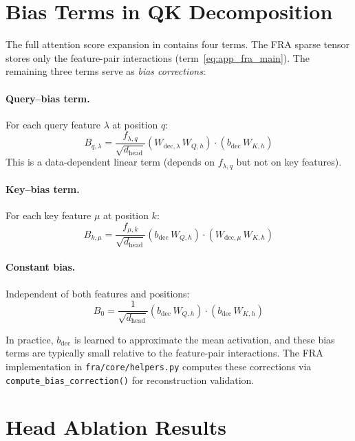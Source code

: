 \documentclass{article}
\theoremstyle{plain}
\theoremstyle{definition}
\theoremstyle{remark}
\newcommand{\dhead}{d_{\mathrm{head}}}
\begin{document}
\section{Bias Terms in QK Decomposition}
\label{app:bias_terms}

The full attention score expansion in  contains four terms. The FRA sparse tensor stores only the feature-pair interactions (term~\ref{eq:app_fra_main}). The remaining three terms serve as \emph{bias corrections}:

\paragraph{Query--bias term.} For each query feature $\lambda$ at position $q$:
\begin{equation}
    B_{q,\lambda} = \frac{f_{\lambda,q}}{\sqrt{\dhead}} \left( W_{\mathrm{dec},\lambda}\,W_{Q,h} \right) \cdot \left( b_{\mathrm{dec}}\,W_{K,h} \right)
\end{equation}
This is a data-dependent linear term (depends on $f_{\lambda,q}$ but not on key features).

\paragraph{Key--bias term.} For each key feature $\mu$ at position $k$:
\begin{equation}
    B_{k,\mu} = \frac{f_{\mu,k}}{\sqrt{\dhead}} \left( b_{\mathrm{dec}}\,W_{Q,h} \right) \cdot \left( W_{\mathrm{dec},\mu}\,W_{K,h} \right)
\end{equation}

\paragraph{Constant bias.} Independent of both features and positions:
\begin{equation}
    B_0 = \frac{1}{\sqrt{\dhead}} \left( b_{\mathrm{dec}}\,W_{Q,h} \right) \cdot \left( b_{\mathrm{dec}}\,W_{K,h} \right)
\end{equation}

In practice, $b_{\mathrm{dec}}$ is learned to approximate the mean activation, and these bias terms are typically small relative to the feature-pair interactions. The FRA implementation in \texttt{fra/core/helpers.py} computes these corrections via \texttt{compute\_bias\_correction()} for reconstruction validation.


\section{Head Ablation Results}
\label{app:head_ablation}
\end{document}
